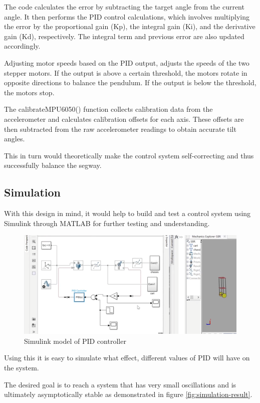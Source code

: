 The code calculates the error by subtracting the target angle from the current angle. It then performs the PID control calculations, which involves multiplying the error by the proportional gain (Kp), the integral gain (Ki), and the derivative gain (Kd), respectively. The integral term and previous error are also updated accordingly.

Adjusting motor speeds based on the PID output, adjusts the speeds of the two stepper motors. If the output is above a certain threshold, the motors rotate in opposite directions to balance the pendulum. If the output is below the threshold, the motors stop.

The calibrateMPU6050() function collects calibration data from the accelerometer and calculates calibration offsets for each axis. These offsets are then subtracted from the raw accelerometer readings to obtain accurate tilt angles.

This in turn would theoretically make the control system self-correcting and thus successfully balance the segway.

\newpage
\subsection{Simulation}

With this design in mind, it would help to build and test a control system using Simulink through MATLAB for further testing and understanding. 

\begin{figure}
    \centerline{\includegraphics[width=\textwidth]{images/simulink-diagram.png}}
    \caption{Simulink model of PID controller}
\end{figure}

Using this it is easy to simulate what effect, different values of PID will have on the system. 

The desired goal is to reach a system that has very small oscillations and is \\
ultimately asymptotically stable as demonstrated in figure \ref{fig:simulation-result}.

